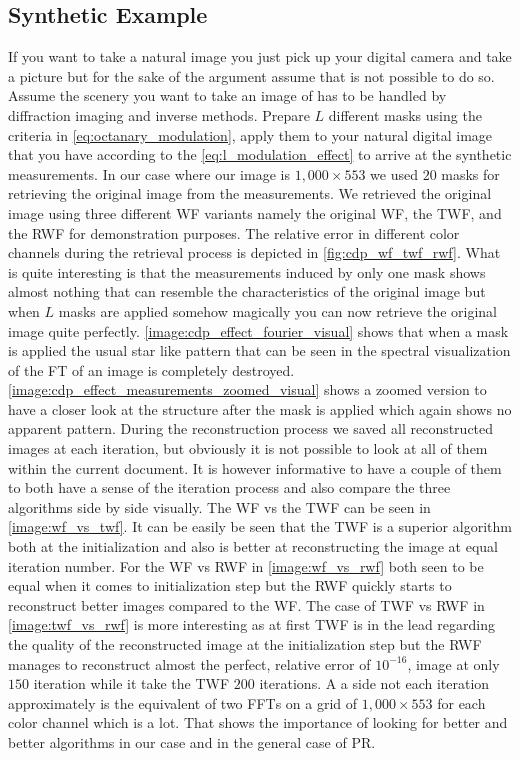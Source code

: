 \subsection{Synthetic Example}
If you want to take a natural image you just pick up your digital camera and take a picture but for the sake of the argument assume that is not possible to do so. 
Assume the scenery you want to take an image of has to be handled by diffraction imaging and inverse methods. Prepare $L$ different masks using the criteria in \cref{eq:octanary_modulation}, 
apply them to your natural digital image that you have according to the \cref{eq:l_modulation_effect} to arrive at the synthetic measurements. In our case where our image 
is $1,000 \times 553$ we used $20$ masks for retrieving the original image from the measurements. We retrieved the original image using three different \ac{WF} variants namely 
the original \ac{WF}, the \ac{TWF}, and the \ac{RWF} for demonstration purposes. The relative error in different color channels during the retrieval process is 
depicted in \cref{fig:cdp_wf_twf_rwf}. What is quite interesting is that the measurements induced by only one mask shows almost nothing that can resemble the characteristics 
of the original image but when $L$ masks are applied somehow magically you can now retrieve the original image quite perfectly. 
\cref{image:cdp_effect_fourier_visual} shows that when a mask is applied the usual star like pattern that can be seen in the spectral visualization of the 
\ac{FT} of an image is completely destroyed. \cref{image:cdp_effect_measurements_zoomed_visual} shows a zoomed version to have a closer 
look at the structure after the mask is applied which again shows no apparent pattern. During the reconstruction process we saved all reconstructed images at each iteration, but 
obviously it is not possible to look at all of them within the current document. It is however informative to have a couple of them to both have a sense 
of the iteration process and also compare the three algorithms side by side visually. The \ac{WF} vs the \ac{TWF} can be seen in \cref{image:wf_vs_twf}. It can be 
easily be seen that the \ac{TWF} is a superior algorithm both at the initialization and also is better at reconstructing the image at equal iteration number. For 
the \ac{WF} vs \ac{RWF} in \cref{image:wf_vs_rwf} both seen to be equal when it comes to initialization step but the \ac{RWF} quickly starts to reconstruct better 
images compared to the \ac{WF}. The case of \ac{TWF} vs \ac{RWF} in \cref{image:twf_vs_rwf} is more interesting as at first \ac{TWF} is in the lead regarding the 
quality of the reconstructed image at the initialization step but the \ac{RWF} manages to reconstruct almost the perfect, relative error of $10^{-16}$, image at only $150$ iteration 
while it take the \ac{TWF} $200$ iterations. A a side not each iteration approximately is the equivalent of two \textsc{FFT}s on a grid of $1,000 \times 553$ for each color channel which is a lot. 
That shows the importance of looking for better and better algorithms in our case and in the general case of \acl*{PR}.

